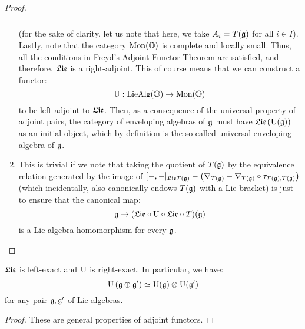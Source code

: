 \begin{proof}
\begin{enumerate}
$$\begin{tikzcd}
                                        \end{tikzcd}
                                    $$
                                (for the sake of clarity, let us note that here, we take $A_i = T(\mathfrak{g})$ for all $i \in I$). Lastly, note that the category $\mathrm{Mon}(\mathbb{O})$ is complete and locally small. Thus, all the conditions in Freyd's Adjoint Functor Theorem are satisfied, and therefore, $\mathfrak{Lie}$ is a right-adjoint. This of course means that we can construct a functor:
                                    $$\mathrm{U}: \mathrm{Lie}\mathrm{Alg}(\mathbb{O}) \to \mathrm{Mon}(\mathbb{O})$$
                                to be left-adjoint to $\mathfrak{Lie}$. Then, as a consequence of the universal property of adjoint pairs, the category of enveloping algebras of $\mathfrak{g}$ must have $\mathfrak{Lie}\left(\mathrm{U}(\mathfrak{g})\right)$ as an initial object, which by definition is the so-called universal enveloping algebra of $\mathfrak{g}$.
                                \item This is trivial if we note that taking the quotient of $T(\mathfrak{g})$ by the equivalence relation generated by the image of $[-,-]_{\mathfrak{Lie} T(\mathfrak{g})} - \left(\nabla_{T(\mathfrak{g})} - \nabla_{T(\mathfrak{g})} \circ \tau_{T(\mathfrak{g}), T(\mathfrak{g})}\right)$ (which incidentally, also canonically endows $T(\mathfrak{g})$ with a Lie bracket) is just to ensure that the canonical map:
                                    $$\mathfrak{g} \to (\mathfrak{Lie} \circ \mathrm{U} \circ \mathfrak{Lie} \circ T)(\mathfrak{g})$$
                                is a Lie algebra homomorphism for every $\mathfrak{g}$.
                            \end{enumerate}
                        \end{proof}
                    \begin{corollary}
                        $\mathfrak{Lie}$ is left-exact and $\mathrm{U}$ is right-exact. In particular, we have:
                            $$\U\left(\g \oplus \g'\right) \cong \U(\g) \tensor \U(\g')$$
                        for any pair $\mathfrak{g}, \mathfrak{g}'$ of Lie algebras. 
                    \end{corollary}
                        \begin{proof}
                            These are general properties of adjoint functors.
                        \end{proof}

